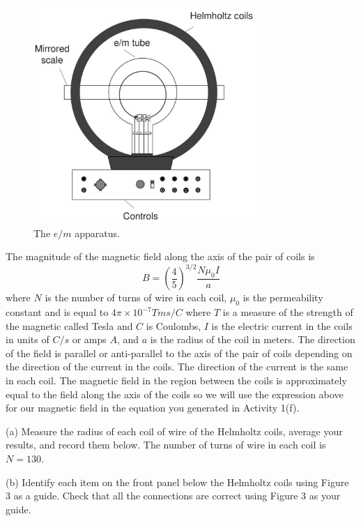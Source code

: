 \begin{figure}[!b]
\begin{center}
\includegraphics[height=3.25in]{eoverm2/apparatus1.pdf}
\caption{The $e/m$ apparatus.}
\end{center}
\end{figure}

The magnitude of the magnetic field along the axis of the pair of coils is
\begin{equation}
B = \left ( \frac{4}{5} \right )^{3/2} \frac{N \mu_0 I}{a}
\end{equation}
where $N$ is the number of turns of wire in each coil, $\mu_0$ is the permeability constant 
and is equal to $4\pi\times 10^{-7} Tms/C$ where $T$ is a measure of the strength of the magnetic called
Tesla and $C$ is Coulombs,  $I$ is the electric current in the coils in units of $C/s$ or amps $A$,
and $a$ is the radius of the coil in meters.
The direction of the field is parallel or anti-parallel
to the axis of the pair of coils depending on the direction of the current
in the coils.
The direction of the current is the same in each coil.
The magnetic field in the region between the coils is approximately equal
to the field along the axis of the coils so we will use
the expression above for our magnetic field in the equation you generated in
Activity 1(f).

(a) Measure the radius of each coil of wire of the Helmholtz coils, 
average your results, and record them
below.
The number of turns of wire in each coil is $N=130$.
\vspace{15mm}


(b) Identify each item on the front panel below
the Helmholtz coils using Figure 3 as a guide.
Check that all the connections are correct using Figure 3 as your guide. 

